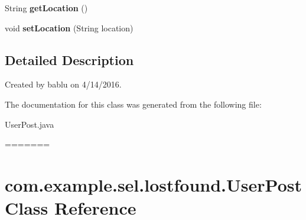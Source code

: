 \begin{DoxyCompactItemize}
\item 
\hypertarget{classcom_1_1example_1_1sel_1_1lostfound_1_1UserPost_a270d7e2d632aeaaf74c0157f8cd59dce}{String {\bfseries get\-Location} ()}\label{classcom_1_1example_1_1sel_1_1lostfound_1_1UserPost_a270d7e2d632aeaaf74c0157f8cd59dce}

\item 
\hypertarget{classcom_1_1example_1_1sel_1_1lostfound_1_1UserPost_ad5125a5c2edf33651ace995ae065ecdf}{void {\bfseries set\-Location} (String location)}\label{classcom_1_1example_1_1sel_1_1lostfound_1_1UserPost_ad5125a5c2edf33651ace995ae065ecdf}

\end{DoxyCompactItemize}


\subsection{Detailed Description}
Created by bablu on 4/14/2016. 

The documentation for this class was generated from the following file\-:\begin{DoxyCompactItemize}
\item 
User\-Post.\-java\end{DoxyCompactItemize}
=======
\hypertarget{classcom_1_1example_1_1sel_1_1lostfound_1_1UserPost}{\section{com.\-example.\-sel.\-lostfound.\-User\-Post \-Class \-Reference}
\label{classcom_1_1example_1_1sel_1_1lostfound_1_1UserPost}
}
